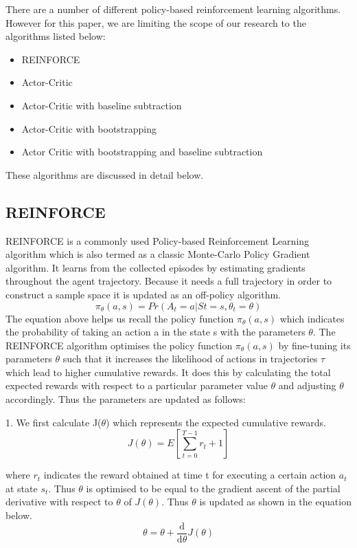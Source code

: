 \documentclass{article}
\begin{document}
There are a number of different policy-based reinforcement learning algorithms. However for this paper, we are limiting the scope of our research to the algorithms listed below: 

\begin{itemize}
\item REINFORCE
\item Actor-Critic
\item Actor-Critic with baseline subtraction
\item Actor-Critic with bootstrapping
\item Actor Critic with bootstrapping and baseline subtraction
\end{itemize}
These algorithms are discussed in detail below. 

\subsection{REINFORCE}
\quad REINFORCE is a commonly used Policy-based Reinforcement Learning algorithm which is also termed as a classic Monte-Carlo Policy Gradient algorithm. It learns from the collected episodes by estimating gradients throughout the agent trajectory. Because it needs a full trajectory in order to construct a sample space it is updated as an off-policy algorithm. \newline
\begin{equation}
\pi_\theta(a, s) = Pr(A_t = a | St = s, \theta_t = \theta)
\end{equation}
The equation above helps us recall the policy function $\pi_{\theta}(a, s)$ which indicates the probability of taking an action a in the state s with the parameters $\theta$. \newline
The REINFORCE algorithm optimises the policy function $\pi_{\theta}(a,s)$ by fine-tuning its parameters $\theta$ such that it increases the likelihood of actions in trajectories $\tau$ which lead to higher cumulative rewards. It does this by calculating the total expected rewards with respect to a particular parameter value $\theta$ and adjusting $\theta$ accordingly. Thus the parameters are updated as follows: \newline

1. We first calculate J($\theta$) which represents the expected cumulative rewards. 
\begin{equation}
J(\theta) = E[ \sum_{t=0}^{T-1}r_t + 1] 
\end{equation}

where $r_{t}$ indicates the reward obtained at time t for executing a certain action $a_t$ at state $s_t$.
Thus $\theta$ is optimised to be equal to the gradient ascent of the partial derivative with respect to $\theta$ of $J(\theta)$. Thus $\theta$ is updated as shown in the equation below. 
\begin{equation}
\theta = \theta + \frac{\mathrm{d}  }{\mathrm{d} \theta} J(\theta)
\end{equation}
\end{document}
